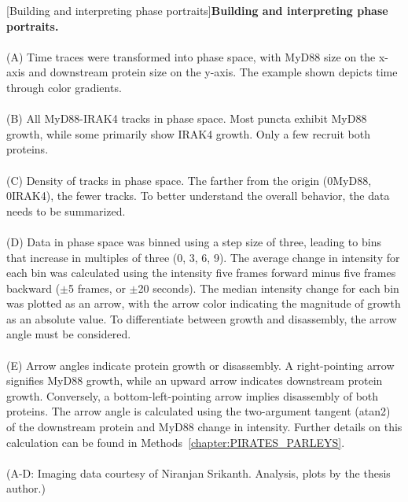 \begin{centering}
\captionsetup{parbox=none}
[Building and interpreting phase portraits]{\textbf{Building and interpreting phase portraits.} 
\\
\\
(A) Time traces were transformed into phase space, with MyD88 size on the x-axis and downstream protein size on the y-axis. The example shown depicts time through color gradients.
\\
\\
(B) All MyD88-IRAK4 tracks in phase space. Most puncta exhibit MyD88 growth, while some primarily show IRAK4 growth. Only a few recruit both proteins.
\\
\\
(C) Density of tracks in phase space. The farther from the origin (0\times MyD88, 0\times IRAK4), the fewer tracks. To better understand the overall behavior, the data needs to be summarized.
\\
\\
(D) Data in phase space was binned using a step size of three, leading to bins that increase in multiples of three (0\times, 3\times, 6\times, 9\times). The average change in intensity for each bin was calculated using the intensity five frames forward minus five frames backward ($\pm$5 frames, or $\pm$20 seconds). The median intensity change for each bin was plotted as an arrow, with the arrow color indicating the magnitude of growth as an absolute value. To differentiate between growth and disassembly, the arrow angle must be considered.
\\
\\
(E) Arrow angles indicate protein growth or disassembly. A right-pointing arrow signifies MyD88 growth, while an upward arrow indicates downstream protein growth. Conversely, a bottom-left-pointing arrow implies disassembly of both proteins. The arrow angle is calculated using the two-argument tangent (atan2) of the downstream protein and MyD88 change in intensity. Further details on this calculation can be found in Methods~\ref{chapter:PIRATES_PARLEYS}.
\\
\\
(A-D: Imaging data courtesy of Niranjan Srikanth. Analysis, plots by the thesis author.)}
\label{p2:3a}
\end{centering}

